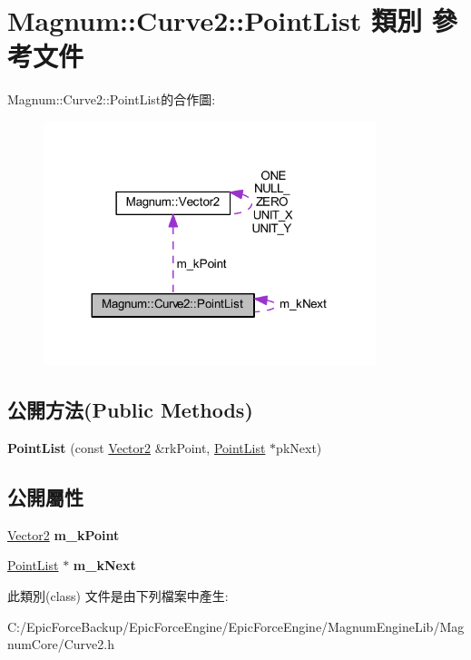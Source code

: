 \hypertarget{class_magnum_1_1_curve2_1_1_point_list}{}\section{Magnum\+:\+:Curve2\+:\+:Point\+List 類別 參考文件}
\label{class_magnum_1_1_curve2_1_1_point_list}


Magnum\+:\+:Curve2\+:\+:Point\+List的合作圖\+:\nopagebreak
\begin{figure}[H]
\begin{center}
\leavevmode
\includegraphics[width=275pt]{class_magnum_1_1_curve2_1_1_point_list__coll__graph}
\end{center}
\end{figure}
\subsection*{公開方法(Public Methods)}
\begin{DoxyCompactItemize}
\item 
{\bfseries Point\+List} (const \hyperlink{class_magnum_1_1_vector2}{Vector2} \&rk\+Point, \hyperlink{class_magnum_1_1_curve2_1_1_point_list}{Point\+List} $\ast$pk\+Next)\hypertarget{class_magnum_1_1_curve2_1_1_point_list_a26e4423ad6ca960ba37f627055081db0}{}\label{class_magnum_1_1_curve2_1_1_point_list_a26e4423ad6ca960ba37f627055081db0}

\end{DoxyCompactItemize}
\subsection*{公開屬性}
\begin{DoxyCompactItemize}
\item 
\hyperlink{class_magnum_1_1_vector2}{Vector2} {\bfseries m\+\_\+k\+Point}\hypertarget{class_magnum_1_1_curve2_1_1_point_list_afa16acc45ff54aa41d31da6fc0d15241}{}\label{class_magnum_1_1_curve2_1_1_point_list_afa16acc45ff54aa41d31da6fc0d15241}

\item 
\hyperlink{class_magnum_1_1_curve2_1_1_point_list}{Point\+List} $\ast$ {\bfseries m\+\_\+k\+Next}\hypertarget{class_magnum_1_1_curve2_1_1_point_list_a5f70f0a5c95cad5f6f90f07cc21c622f}{}\label{class_magnum_1_1_curve2_1_1_point_list_a5f70f0a5c95cad5f6f90f07cc21c622f}

\end{DoxyCompactItemize}


此類別(class) 文件是由下列檔案中產生\+:\begin{DoxyCompactItemize}
\item 
C\+:/\+Epic\+Force\+Backup/\+Epic\+Force\+Engine/\+Epic\+Force\+Engine/\+Magnum\+Engine\+Lib/\+Magnum\+Core/Curve2.\+h\end{DoxyCompactItemize}
